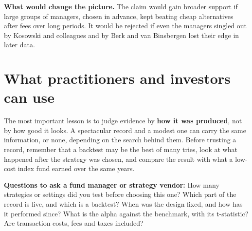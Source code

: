 \textbf{What would change the picture.} The claim would gain broader support if large groups of managers, chosen in advance, kept beating cheap alternatives after fees over long periods. It would be rejected if even the managers singled out by Kosowski and colleagues and by Berk and van Binsbergen lost their edge in later data.

\section{What practitioners and investors can use}
\label{sec:01-investors}

The most important lesson is to judge evidence by \textbf{how it was produced}, not by how good it looks. A spectacular record and a modest one can carry the same information, or none, depending on the search behind them. Before trusting a record, remember that a backtest may be the best of many tries, look at what happened after the strategy was chosen, and compare the result with what a low-cost index fund earned over the same years.

\textbf{Questions to ask a fund manager or strategy vendor:} How many strategies or settings did you test before choosing this one? Which part of the record is live, and which is a backtest? When was the design fixed, and how has it performed since? What is the alpha against the benchmark, with its t-statistic? Are transaction costs, fees and taxes included?

\makeatletter
{}
\makeatother

